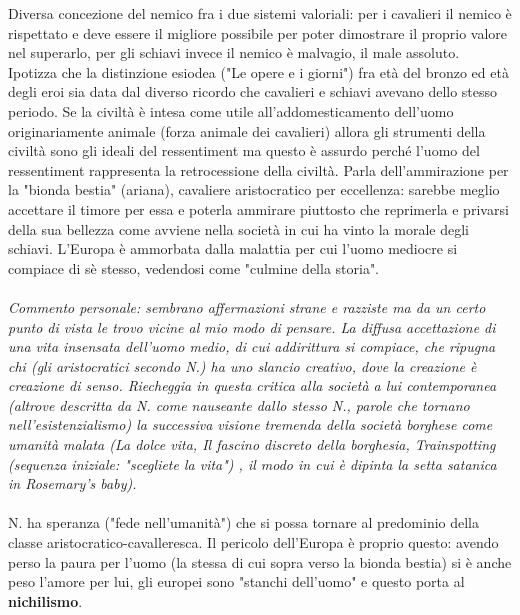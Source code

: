 \documentclass[10pt,a4paper]{article}
\begin{document}
Diversa concezione del nemico fra i due sistemi valoriali: per i cavalieri il nemico è rispettato e deve essere il migliore possibile per poter dimostrare il proprio valore nel superarlo, per gli schiavi invece il nemico è malvagio, il male assoluto. Ipotizza che la distinzione esiodea ("Le opere e i giorni") fra età del bronzo ed età degli eroi sia data dal diverso ricordo che cavalieri e schiavi avevano dello stesso periodo. Se la civiltà è intesa come utile all'addomesticamento dell'uomo originariamente animale (forza animale dei cavalieri) allora gli strumenti della civiltà sono gli ideali del ressentiment ma questo è assurdo perché l'uomo del ressentiment rappresenta la retrocessione della civiltà. Parla dell'ammirazione per la "bionda bestia" (ariana), cavaliere aristocratico per eccellenza: sarebbe meglio accettare il timore per essa e poterla ammirare piuttosto che reprimerla e privarsi della sua bellezza come avviene nella società in cui ha vinto la morale degli schiavi. L'Europa è ammorbata dalla malattia per cui l'uomo mediocre si compiace di sè stesso, vedendosi come "culmine della storia".\\\\

\textit{Commento personale: sembrano affermazioni strane e razziste ma da un certo punto di vista le trovo vicine al mio modo di pensare. La diffusa accettazione di una vita insensata dell'uomo medio, di cui addirittura si compiace, che ripugna chi (gli aristocratici secondo N.) ha uno slancio creativo, dove la creazione è creazione di senso. Riecheggia in questa critica alla società a lui contemporanea (altrove descritta da N. come nauseante dallo stesso N., parole che tornano nell'esistenzialismo) la successiva visione tremenda della società borghese come umanità malata (La dolce vita, Il fascino discreto della borghesia, Trainspotting (sequenza iniziale: "scegliete la vita") , il modo in cui è dipinta la setta satanica in Rosemary's baby). }\\\\

N. ha speranza ("fede nell'umanità") che si possa tornare al predominio della classe aristocratico-cavalleresca. Il pericolo dell'Europa è proprio questo: avendo perso la paura per l'uomo (la stessa di cui sopra verso la bionda bestia) si è anche peso l'amore per lui, gli europei sono "stanchi dell'uomo" e questo porta al \textbf{nichilismo}.
\end{document}
